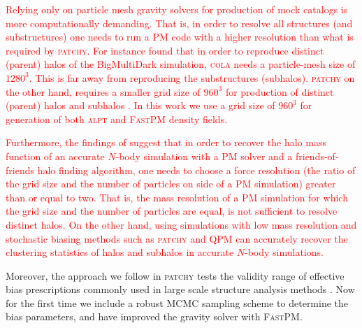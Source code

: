 \documentclass[english,usenatbib]{mn2e}
\newcommand{\tod}[1]{{\textcolor{red}{ #1}}}
\begin{document}
\tod{Relying only on particle mesh gravity solvers for production of mock catalogs is more computationally demanding. That is, in order to resolve all structures (and substructures) one needs to run a PM code with a higher resolution than what is required by \textsc{patchy}. For instance \citet{chuang2015} found that in order to reproduce distinct (parent) halos of the BigMultiDark simulation, \textsc{cola} needs a particle-mesh size of $1280^3$. This is far away from reproducing the substructures (subhalos). \textsc{patchy} on the other hand, requires a smaller grid size of $960^3$ for production of distinct (parent) halos and subhalos \citep[see][]{chuang2015}. 
In this work we use a grid size of $960^3$ for generation of both \textsc{alpt} and \textsc{FastPM} density fields.}

\tod{Furthermore, the findings of \citet{fastpm} suggest that in order to recover the halo mass function of an accurate $N$-body simulation with a PM solver and a friends-of-friends halo finding algorithm, one needs to choose a force resolution (the ratio of the grid size and the number of particles on side of a PM simulation) greater than or equal to two. That is, the mass resolution of a PM simulation for which the grid size and the number of particles are equal, is not sufficient to resolve distinct halos. On the other hand, using simulations with low mass resolution and stochastic biasing methods such as \textsc{patchy} and \textsc{QPM} can accurately recover the clustering statistics of halos and subhalos in accurate $N$-body simulations.}

Moreover, the approach we follow in \textsc{patchy} tests the validity range of effective bias prescriptions commonly used in large scale structure analysis methods \citep[see e.g.][]{ata2015}. Now for the first time we include a robust MCMC sampling scheme to determine the bias parameters, and have improved the gravity solver with \textsc{FastPM}.
\end{document}
